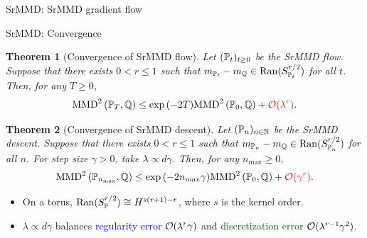 \documentclass[aspectratio=169,xcolor=dvipsnames]{beamer}
\newtheorem{thm}{Theorem}
\newcommand{\green}[1]{\textcolor{darkgreen}{#1}}
\newcommand{\blue}[1]{\textcolor{blue}{#1}}
\begin{document}
\begin{frame}{SrMMD: SrMMD gradient flow}
\begin{center}
\end{center}
\vspace{-6pt}
\end{frame}

\begin{frame}{SrMMD: Convergence}
    \begin{thm}[Convergence of SrMMD flow]
        Let $(\mathbb{P}_t)_{t\geq0}$ be the SrMMD flow. Suppose that there exists $0<r \leq 1$ such that $m_{\mathbb{P}_t}-m_{\mathbb{Q}} \in \operatorname{Ran} (S_{\mathbb{P}_t}^{r / 2})$ for all $t$.
        Then, for any $T\geq 0$,
        \begin{align*}
            \mathrm{MMD}^2\left(\mathbb{P}_T, \mathbb{Q}\right) \leq \exp{(-2 T)} \mathrm{MMD}^2\left(\mathbb{P}_0, \mathbb{Q}\right)+ \textcolor{red}{\mathcal{O}(\lambda^r)} .
        \end{align*}
    \end{thm}
    \begin{thm}[Convergence of SrMMD descent]
        Let $(\mathbb{P}_n)_{n\in\mathbb{N}}$ be the SrMMD descent. Suppose that there exists $0<r \leq 1$ such that $m_{\mathbb{P}_n}-m_{\mathbb{Q}} \in \operatorname{Ran} (S_{\mathbb{P}_n}^{r / 2})$ for all $n$.
        For step size $\gamma>0$, take $\lambda\propto d \gamma$.
        Then, for any $n_{\max} \geq 0$,
        \begin{align*}
            \mathrm{MMD}^2\left(\mathbb{P}_{n_{\max}}, \mathbb{Q}\right) \leq \exp{(-2 n_{\max} \gamma)} \mathrm{MMD}^2\left(\mathbb{P}_0, \mathbb{Q}\right)+ \textcolor{red}{\mathcal{O}(\gamma^r)} .
        \end{align*}
    \end{thm}
    \begin{itemize}
        \small
        \item On a torus, $\operatorname{Ran}(S_{\mathbb{P}}^{r / 2}) \cong H^{s(r+1)-r}$, where $s$ is the kernel order.
        \item $\lambda\propto d \gamma$ balances \blue{regularity error $\mathcal{O}(\lambda^r \gamma)$} and \green{discretization error $\mathcal{O}(\lambda^{r-1} \gamma^2)$}.
    \end{itemize}
\end{frame}
\end{document}
